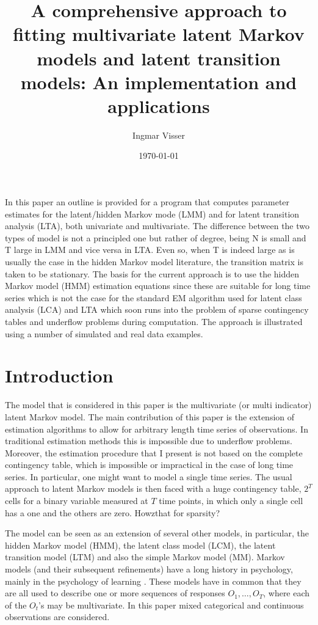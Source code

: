 \documentclass[a4paper,man,nobf]{apa}
\title{A comprehensive approach to fitting multivariate latent Markov 
models and latent transition models: An implementation and 
applications}
\author{Ingmar Visser}
\affiliation{Developmental Processes Research Group, Department of 
Psychology, University of Amsterdam}
\date{\today}
\begin{document}
%

\maketitle



In this paper an outline is provided for a program that computes 
parameter estimates for the latent/hidden Markov mode (LMM) and for 
latent transition analysis (LTA), both univariate and multivariate.  
The difference between the two types of model is not a principled one 
but rather of degree, being N is small and T large in LMM and vice 
versa in LTA. Even so, when T is indeed large as is usually the case 
in the hidden Markov model literature, the transition matrix is taken 
to be stationary. The basis for the current approach is to use the 
hidden Markov model (HMM) estimation equations since these are 
suitable for long time series which is not the case for the standard 
EM algorithm used for latent class analysis (LCA) and LTA which soon 
runs into the problem of sparse contingency tables and underflow 
problems during computation.  The approach is illustrated using a 
number of simulated and real data examples.


\section{Introduction}

The model that is considered in this paper is the multivariate (or 
multi indicator) latent Markov model. The main contribution of this 
paper is the extension of estimation algorithms to allow for 
arbitrary length time series of observations. In traditional 
estimation methods this is impossible due to underflow problems. 
Moreover, the estimation procedure that I present is not based on the 
complete contingency table, which is impossible or impractical in the 
case of long time series. In particular, one might want to model a 
single time series. The usual approach to latent Markov models is 
then faced with a huge contingency table, $2^{T}$ cells for a binary 
variable measured at $T$ time points, in which only a single cell has 
a one and the others are zero. Howzthat for sparsity? 

The model can be seen as an extension of several other models, in 
particular, the hidden Markov model (HMM), the latent class model 
(LCM), the latent transition model (LTM) and also the simple Markov 
model (MM). Markov models (and their subsequent refinements) have a 
long history in psychology, mainly in the psychology of learning 
\citep{Wic82}. These models have in common that they are all used to 
describe one or more sequences of responses $O_{1}, \ldots, O_{T}$, 
where each of the $O_{t}$'s may be multivariate. In this paper mixed 
categorical and continuous observations are considered. 
\end{document}

